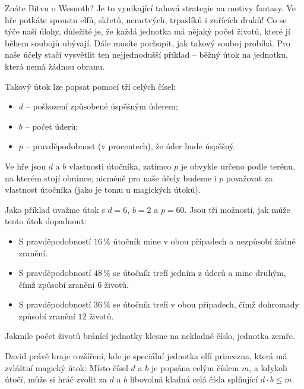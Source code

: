 
\usepackage[czech]{babel}





Znáte Bitvu o Wesnoth? Je to vynikající tahová strategie na motivy fantasy.
Ve hře potkáte spoustu elfů, skřetů, nemrtvých, trpaslíků i zuřících draků!
Co se týče naší úlohy, důležité je, že každá jednotka má nějaký počet životů,
které jí během soubojů ubývají. Dále musíte pochopit, jak takový souboj probíhá.
Pro naše účely stačí vysvětlit ten nejjednodušší příklad --
běžný útok na jednotku, která nemá žádnou obranu.

Takový útok lze popsat pomocí tří celých čísel:
\begin{itemize}
 \item $d$ -- poškození způsobené úspěšným úderem;
 \item $b$ -- počet úderů;
 \item $p$ -- pravděpodobnost (v procentech), že úder bude úspěšný.
\end{itemize}
Ve hře jsou $d$ a $b$ vlastnosti útočníka, zatímco $p$ je obvykle určeno podle terénu,
na kterém stojí obránce; nicméně pro naše účely budeme i $p$ považovat za vlastnost útočníka
(jako je tomu u magických útoků).

Jako příklad uvažme útok s $d=6$, $b=2$ a $p=60$. Jsou tři možnosti, jak může tento útok dopadnout:
\begin{itemize}
 \item S pravděpodobností $16\,\%$ útočník mine v obou případech a nezpůsobí žádné zranění.
 \item S pravděpodobností $48\,\%$ se útočník trefí jedním z úderů a mine druhým, čímž způsobí zranění $6$ životů.
 \item S pravděpodobností $36\,\%$ se útočník trefí v obou případech, čímž dohromady způsobí zranění $12$ životů.
\end{itemize}
Jakmile počet životů bránící jednotky klesne na nekladné číslo, jednotka zemře.

David právě hraje rozšíření, kde je speciální jednotka elfí princezna, která má zvláštní magický útok:
Místo čísel $d$ a $b$ je popsána celým číslem $m$, a kdykoli útočí, může si hráč zvolit
za $d$ a $b$ libovolná kladná celá čísla splňující $d\cdot b\leq m$.

